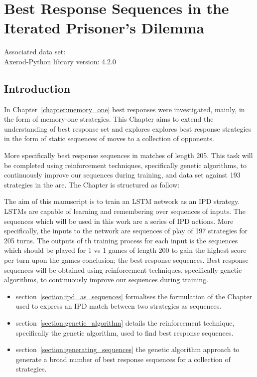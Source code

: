 \chapter{Best Response Sequences in the Iterated Prisoner's Dilemma}\label{chapter:best_response_sequence}

\begin{center}
    Associated data set: \cite{Glynatsi2020_sequences} \\
    Axerod-Python library version: 4.2.0 \\ \vspace{.5cm}
\end{center}

\section{Introduction}

In Chapter~\ref{chapter:memory_one} best responses were investigated, mainly, in
the form of memory-one strategies. This Chapter aims to extend the understanding
of best response set and explores explores best response strategies in the form
of static sequences of moves to a collection of opponents.

More specifically  best response sequences in matches of length 205. This task
will be completed using reinforcement techniques, specifically genetic
algorithms, to continuously improve our sequences during training, and data set
against 193 strategies in the are. The Chapter is structured as follow:

The aim of this manuscript is to train an LSTM network as an IPD strategy. LSTMs
are capable of learning and remembering over sequences of inputs. The sequences
which will be used in this work are a series of IPD actions. More specifically,
the inputs to the network are sequences of play of 197 strategies for 205 turns.
The outputs of th training process for each input is the sequences which should be
played for 1 vs 1 games of length 200 to gain the highest score per turn upon
the games conclusion; the best response sequences. Best response sequences will
be obtained using reinforcement techniques, specifically genetic algorithms, to
continuously improve our sequences during training.

\begin{itemize}
    \item section~\ref{section:ipd_as_sequences} formalises the formulation of
    the Chapter used to express an IPD match between two strategies as
    sequences.
    \item section~\ref{section:genetic_algorithm} details the reinforcement
    technique, specifically the genetic algorithm, used to find best response
    sequences.
    \item section~\ref{section:generating_sequences} the genetic algorithm
    approach to generate a broad number of best response sequences for a
    collection of strategies.
\end{itemize}

